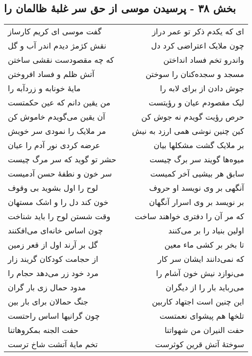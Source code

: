 \begin{center}
\section*{بخش ۳۸ - پرسیدن موسی از حق سر غلبهٔ ظالمان را}
\label{sec:sh038}
\begin{longtable}{l p{0.5cm} r}
گفت موسی ای کریم کارساز
&&
ای که یکدم ذکر تو عمر دراز
\\
نقش کژمژ دیدم اندر آب و گل
&&
چون ملایک اعتراضی کرد دل
\\
که چه مقصودست نقشی ساختن
&&
واندرو تخم فساد انداختن
\\
آتش ظلم و فساد افروختن
&&
مسجد و سجده‌کنان را سوختن
\\
مایهٔ خونابه و زردآبه را
&&
جوش دادن از برای لابه را
\\
من یقین دانم که عین حکمتست
&&
لیک مقصودم عیان و رؤیتست
\\
آن یقین می‌گویدم خاموش کن
&&
حرص رؤیت گویدم نه جوش کن
\\
مر ملایک را نمودی سر خویش
&&
کین چنین نوشی همی ارزد به نیش
\\
عرضه کردی نور آدم را عیان
&&
بر ملایک گشت مشکلها بیان
\\
حشر تو گوید که سر مرگ چیست
&&
میوه‌ها گویند سر برگ چیست
\\
سر خون و نطفهٔ حسن آدمیست
&&
سابق هر بیشیی آخر کمیست
\\
لوح را اول بشوید بی وقوف
&&
آنگهی بر وی نویسد او حروف
\\
خون کند دل را و اشک مستهان
&&
بر نویسد بر وی اسرار آنگهان
\\
وقت شستن لوح را باید شناخت
&&
که مر آن را دفتری خواهند ساخت
\\
چون اساس خانه‌ای می‌افکنند
&&
اولین بنیاد را بر می‌کنند
\\
گل بر آرند اول از قعر زمین
&&
تا بخر بر کشی ماء معین
\\
از حجامت کودکان گریند زار
&&
که نمی‌دانند ایشان سر کار
\\
مرد خود زر می‌دهد حجام را
&&
می‌نوازد نیش خون آشام را
\\
مدود حمال زی بار گران
&&
می‌رباید بار را از دیگران
\\
جنگ حمالان برای بار بین
&&
این چنین است اجتهاد کاربین
\\
چون گرانیها اساس راحتست
&&
تلخها هم پیشوای نعمتست
\\
حفت الجنه بمکروهاتنا
&&
حفت النیران من شهواتنا
\\
تخم مایهٔ آتشت شاخ ترست
&&
سوختهٔ آتش قرین کوثرست
\\

\end{longtable}
\end{center}
